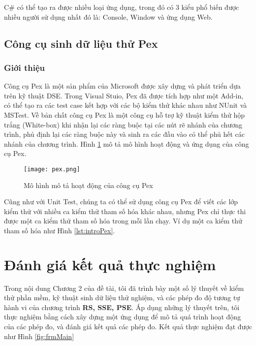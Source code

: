C\# có thể tạo ra được nhiều loại ứng dụng, trong đó có 3 kiểu phổ biến được 
nhiều người sử dụng nhất đó là: Console, Window và ứng dụng Web. 

\subsection{Công cụ sinh dữ liệu thử Pex}
\subsubsection*{Giới thiệu}
Công cụ Pex là một sản phẩm của Microsoft được xây dựng và phát 
triển dựa trên kỹ thuật DSE. Trong Visual Stuio, Pex đã được tích hợp 
như một Add-in, có thể tạo ra các test case kết hợp với các bộ kiểm 
thử khác nhau như NUnit và MSTest. Về bản chất công cụ Pex là một công cụ hỗ trợ 
kỹ thuật kiểm thử hộp trắng (White-box) khi nhận lại các ràng buộc tại các nút 
rẽ nhánh của chương trình, phủ định lại các ràng buộc này và sinh ra các đầu 
vào có thể phủ hết các nhánh của chương trình. Hình \ref{fig:ModelPex} mô tả 
mô hình hoạt động và ứng dụng của công cụ Pex.

\begin{figure}[H]
	\caption{Mô hình mô tả hoạt động của công cụ Pex}
	\label{fig:ModelPex}
	\begin{center}
		\texttt{[image: pex.png]}
	\end{center}	
\end{figure}

Cũng như với Unit Test, chúng ta có thể sử dụng công cụ Pex để viết 
các lớp kiểm thử với nhiều ca kiểm thử tham số hóa khác nhau, nhưng Pex chỉ 
thực thi được một ca kiểm thử tham số hóa trong mỗi lần chạy.
Ví dụ một ca kiểm thử tham số hóa như Hình \ref{lst:introPex}.



\section{Đánh giá kết quả thực nghiệm}

Trong nội dung Chương 2 của đề tài, tôi đã trình bày một số lý thuyết về kiểm
thử phần mềm, kỹ thuật sinh dữ liệu thử nghiệm, và các phép đo
độ tương tự hành vi của chương trình \textbf{RS, SSE, PSE}. Áp dụng những
lý thuyết trên, tôi thực nghiệm bằng cách xây dựng một ứng dụng để mô tả
quá trình hoạt động của các phép đo, và đánh giá kết quả các phép đo. 
Kết quả thực nghiệm đạt được như Hình \ref{fig:frmMain}

